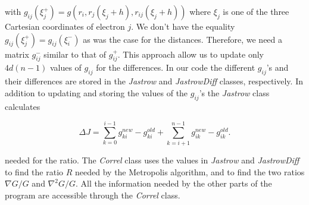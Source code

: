 with $g_{ij}(\xi_{j}^+) = g(r_i, r_j(\xi_j+h), r_{ij}(\xi_j+h))$ where
$\xi_{j}$ is one of the three Cartesian coordinates of electron
$j$. We don't have the equality $g_{ij}(\xi_{j}^+) =
g_{ij}(\xi_{i}^-)$ as was the case for the distances. Therefore, we
need a matrix $g_{ij}^-$ similar to that of $g_{ij}^+$. This approach
allow us to update only $4d(n-1)$ values of $g_{ij}$ for the
differences.
\newline
%
\newline
In our code the different $g_{ij}$'s and their differences are stored
in the \emph{Jastrow} and \emph{JastrowDiff} classes, respectively. In
addition to updating and storing the values of the $g_{ij}$'s the
\emph{Jastrow} class calculates 

\begin{equation*}
  \Delta J = \sum_{k=0}^{i-1} g_{ki}^{new}-g_{ki}^{old} 
  + \sum_{k=i+1}^{n-1} g_{ik}^{new}-g_{ik}^{old}.
\end{equation*}

needed for the ratio. The \emph{Correl} class uses the values in
\emph{Jastrow} and \emph{JastrowDiff} to find the ratio
$R$ needed by the Metropolis algorithm, and to find the two ratios
$\nabla G/G$ and $\nabla^2G/G$. All the information needed by the
other parts of the program are accessible through the \emph{Correl} 
class. 
\newline

